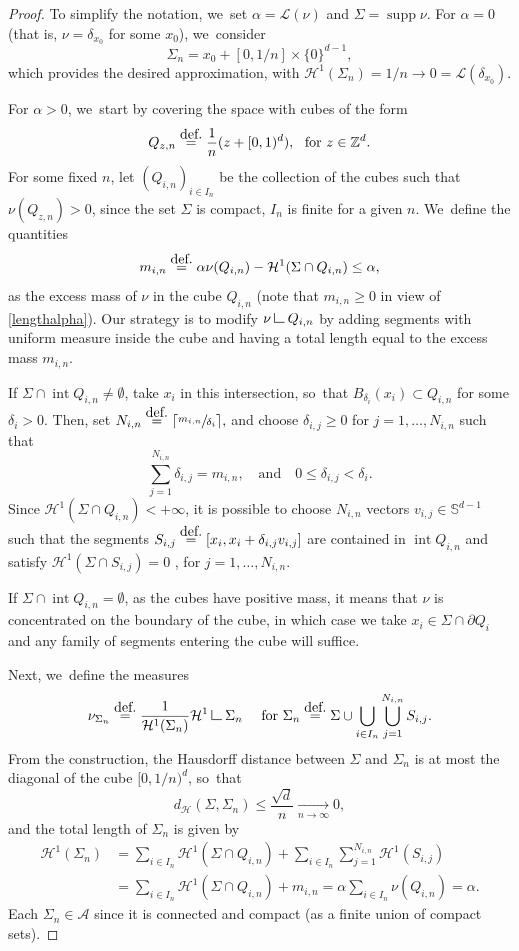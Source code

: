 \documentclass[11pt]{article}
\numberwithin{equation}{section}
\theoremstyle{definition}
\newcommand{\eqdef}{\ensuremath{\stackrel{\mbox{\upshape\tiny def.}}{=}}}
\newcommand\LM[1]{\hbox{\vrule width.5pt \vbox to#1pt{\vfill \hrule width#1pt height.5pt}}}
\newcommand\LL{{\mathchoice {\>\LM7\>}{\>\LM7\>}{\,\LM5\,}{\,\LM{3.35}\,}}}
\newcommand{\mres}{\LL}
\newcommand\A{\mathcal{A}}
\newcommand\cH{\mathcal{H}}
\DeclareMathOperator{\supp}{supp}
\DeclareMathOperator{\inte}{int}
\newcommand{\distH}{d_{\mathcal{H}}}
\newcommand{\ci}[2]{ \left[ #1, #2 \right] }
\begin{document}
\begin{proof}
To simplify the notation, we~set $\alpha = \mathcal{L}(\nu)$ and $\Sigma = \supp\nu$.
For $\alpha=0$ (that is, $\nu=\delta_{x_0}$ for some $x_0$), we~consider
\[
\Sigma_n = x_0 + \ci{0}{1/n}\times \{0\}^{d-1},
\]
which provides the desired approximation, with $\cH^1(\Sigma_n) = 1/n \to 0 = \mathcal{L}(\delta_{x_0})$.

For $\alpha>0$, we~start by covering the space with cubes of the form
\[
Q_{z,n} \eqdef \frac{1}{n}( z + [0,1)^d), \ \text{ for $z \in \mathbb{Z}^d$}.
\]
For some fixed $n$, let $\left(Q_{i,n}\right)_{i \in I_n}$ be the collection of the cubes such that $\nu\left(Q_{z,n}\right) > 0$, since the set $\Sigma$ is compact, $I_n$ is finite for a given $n$. We~define the quantities
\[
m_{i,n} \eqdef \alpha \nu(Q_{i,n}) - \cH^1(\Sigma \cap Q_{i,n}) \le \alpha,
\]
as the excess mass of $\nu$ in the cube $Q_{i,n}$ (note that $m_{i,n}\geq 0$ in view of \eqref{lengthalpha}). Our strategy is to modify $\nu\mres Q_{i,n}$ by adding segments with uniform measure inside the cube and having a total length equal to the excess mass $m_{i,n}$.

If $\Sigma \cap \inte Q_{i,n} \neq \emptyset$, take $x_i$ in this intersection, so~that $B_{\delta_i}(x_i) \subset Q_{i,n}$ for some $\delta_i > 0$. Then, set
$
N_{i,n} \eqdef\lceil \sfrac{m_{i,n}}{\delta_i}\rceil,
$
and choose $\delta_{i,j}\ge 0$ for $j = 1, \dots, N_{i,n}$ such that
\[
\sum_{j = 1}^{N_{i,n}} \delta_{i,j} = m_{i,n}, \quad\text{and}\quad 0 \le \delta_{i,j} < \delta_i.
\]
Since $\cH^1(\Sigma\cap Q_{i,n})<+\infty$, it is possible to choose $N_{i,n}$ vectors $v_{i,j} \in \mathbb{S}^{d-1}$ such that the segments $S_{i,j} \eqdef [x_i, x_i + \delta_{i,j}v_{i,j}]$ are contained in $\inte Q_{i,n}$ and satisfy $\cH^1(\Sigma \cap S_{i,j}) = 0$ , for $j = 1, \dots, N_{i,n}$.

If $\Sigma \cap \inte Q_{i,n} = \emptyset$, as the cubes have positive mass, it means that $\nu$ is concentrated on the boundary of the cube, in which case we take $x_i \in \Sigma \cap \partial Q_i$ and any family of segments entering the cube will suffice.

Next, we~define the measures
\[
\nu_{\Sigma_n}
\eqdef
\frac{1}{\cH^1(\Sigma_n)} \cH^1\mres \Sigma_n
\quad \text{ for }
\Sigma_n \eqdef \Sigma \cup \bigcup_{ i \in I_n}\bigcup_{j = 1}^{N_{i,n}} S_{i,j}.
\]
From the construction, the Hausdorff distance between $\Sigma$ and $\Sigma_n$ is at most the diagonal of the cube $[0,1/n)^d$, so~that
\[
\distH(\Sigma, \Sigma_n) \le \frac{\sqrt{d}}{n} \xrightarrow[n \to \infty]{} 0,
\]
and the total length of $\Sigma_n$ is given by
\begin{align*}
\cH^1(\Sigma_n)
&=
\sum_{i \in I_n} \cH^1(\Sigma \cap Q_{i,n})
+
\sum_{i \in I_n}\sum_{j = 1}^{N_{i,n}}\cH^1(S_{i,j})\\
&=
\sum_{i \in I_n}
\cH^1(\Sigma \cap Q_{i,n}) + m_{i,n}
=
\alpha
\sum_{i \in I_n}
\nu(Q_{i,n}) = \alpha.
\end{align*}
Each $\Sigma_n\in \A$ since it is connected and compact (as a finite union of compact sets).


\end{proof}
\end{document}
